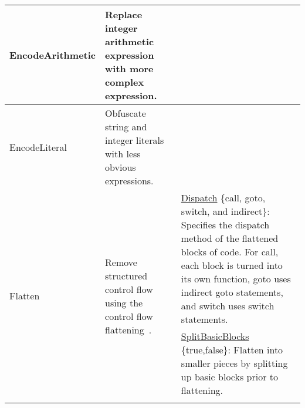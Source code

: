 \begin{table*}[p]
\begin{tabular}{|p{2.25cm}|p{4cm}|p{11cm}|}
EncodeArithmetic                     & Replace integer arithmetic expression with more complex expression.                                                                                                                                                                                                                  &                                                                                                                                                                                                                                                                                            \\ \hline
EncodeLiteral                        & Obfuscate string and integer literals with less obvious expressions.                                                                                                                                                                                                                    &                                                                                                                                                                                                                                                                                               \\ \hline
\multirow{6}{*}{Flatten}             & \multirow{6}{4cm}{Remove structured control flow using the control flow flattening~\cite{wang00security}.}                                                                                                                                                                                         & \underline{Dispatch} \{call, goto, switch, and indirect\}: Specifies the dispatch method of the flattened blocks of code. For call, each block is turned into its own function, goto uses indirect goto statements, and switch uses switch statements.                                                                                                       \\ \cline{3-3} 
                                     &                                                                                                                                                                                                                                                                                                         & \underline{SplitBasicBlocks} \{true,false\}: Flatten into smaller pieces by splitting up basic blocks prior to flattening.                                                                                                                                                              \\ \cline{3-3} 

\end{tabular}
\end{table*}
